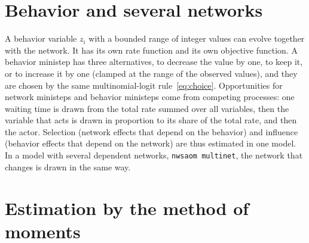 \section{Behavior and several networks}

A behavior variable $z_i$ with a bounded range of integer values can evolve together with the network. It has its own rate function and its own objective function. A behavior ministep has three alternatives, to decrease the value by one, to keep it, or to increase it by one (clamped at the range of the observed values), and they are chosen by the same multinomial-logit rule~\eqref{eq:choice}. Opportunities for network ministeps and behavior ministeps come from competing processes: one waiting time is drawn from the total rate summed over all variables, then the variable that acts is drawn in proportion to its share of the total rate, and then the actor. Selection (network effects that depend on the behavior) and influence (behavior effects that depend on the network) are thus estimated in one model. In a model with several dependent networks, \texttt{nwsaom multinet}, the network that changes is drawn in the same way.

\section{Estimation by the method of moments}

